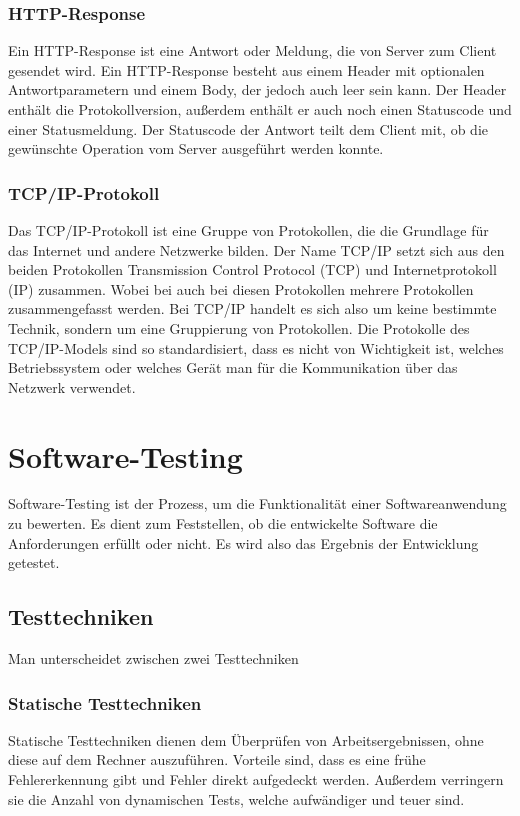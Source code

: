 \subsubsection{HTTP-Response}
Ein HTTP-Response ist eine Antwort oder Meldung, die von Server zum Client gesendet wird. 
Ein HTTP-Response besteht aus einem Header mit optionalen Antwortparametern und einem Body, der
jedoch auch leer sein kann. 
Der Header enthält die Protokollversion, außerdem enthält er auch noch einen Statuscode und einer
Statusmeldung. Der Statuscode der Antwort teilt dem Client mit, ob
die gewünschte Operation vom Server ausgeführt werden konnte.
~\cite{http_response}

\subsubsection{TCP/IP-Protokoll}
Das TCP/IP-Protokoll ist eine Gruppe von Protokollen,
die die Grundlage für das Internet und andere Netzwerke bilden. 
Der Name TCP/IP setzt sich aus den beiden Protokollen Transmission Control Protocol (TCP) und 
Internetprotokoll (IP) zusammen. 
Wobei bei auch bei diesen Protokollen mehrere Protokollen zusammengefasst werden. 
Bei TCP/IP handelt es sich also um keine bestimmte Technik, sondern um eine Gruppierung von Protokollen.
\newline
\newline
Die Protokolle des TCP/IP-Models sind so standardisiert, dass es nicht von Wichtigkeit ist, 
welches Betriebssystem oder welches Gerät man für die Kommunikation über das Netzwerk verwendet.
~\cite{tcp_ip}

\section{Software-Testing}
Software-Testing ist der Prozess, um die Funktionalität einer Softwareanwendung zu bewerten. 
Es dient zum Feststellen, ob die entwickelte Software die Anforderungen erfüllt oder nicht.
Es wird also das Ergebnis der Entwicklung getestet.
~\cite{software_testing}

\subsection{Testtechniken}
Man unterscheidet zwischen zwei Testtechniken
\subsubsection{Statische Testtechniken}
Statische Testtechniken dienen dem Überprüfen von Arbeitsergebnissen, ohne diese auf dem Rechner auszuführen.
\newline
Vorteile sind, dass es eine frühe Fehlererkennung gibt und Fehler direkt aufgedeckt werden.
Außerdem verringern sie die Anzahl von dynamischen Tests, welche aufwändiger und teuer sind.
